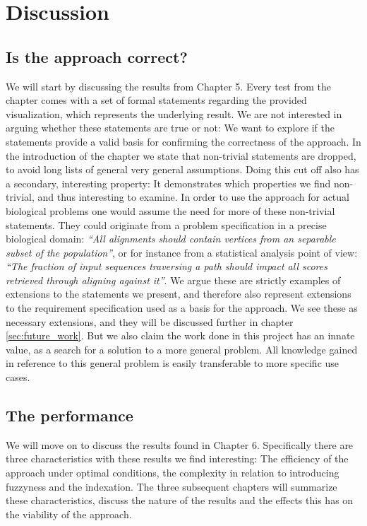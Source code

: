 \documentclass[thesis.tex]{subfiles}
\begin{document}
\chapter{Discussion}
\section{Is the approach correct?}
We will start by discussing the results from Chapter 5. Every test from the chapter comes with a set of formal statements regarding the provided visualization, which represents the underlying result. We are not interested in arguing whether these statements are true or not: We want to explore if the statements provide a valid basis for confirming the correctness of the approach. In the introduction of the chapter we state that non-trivial statements are dropped, to avoid long lists of general very general assumptions. Doing this cut off also has a secondary, interesting property: It demonstrates which properties we find non-trivial, and thus interesting to examine. In order to use the approach for actual biological problems one would assume the need for more of these non-trivial statements. They could originate from a problem specification in a precise biological domain: \textit{``All alignments should contain vertices from an separable subset of the population''}, or for instance from a statistical analysis point of view: \textit{``The fraction of input sequences traversing a path should impact all scores retrieved through aligning against it''}. We argue these are strictly examples of extensions to the statements we present, and therefore also represent extensions to the requirement specification used as a basis for the approach. We see these as necessary extensions, and they will be discussed further in chapter \ref{sec:future_work}. But we also claim the work done in this project has an innate value, as a search for a solution to a more general problem. All knowledge gained in reference to this general problem is easily transferable to more specific use cases.
\section{The performance}
We will move on to discuss the results found in Chapter 6. Specifically there are three characteristics with these results we find interesting: The efficiency of the approach under optimal conditions, the complexity in relation to introducing fuzzyness and the indexation. The three subsequent chapters will summarize these characteristics, discuss the nature of the results and the effects this has on the viability of the approach.
\end{document}
